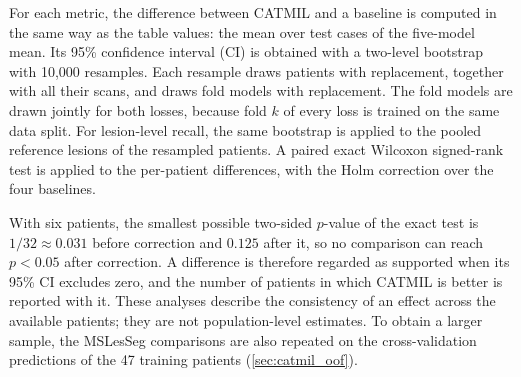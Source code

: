 For each metric, the difference between CATMIL and a baseline is computed
in the same way as the table values: the mean over test cases of the
five-model mean. Its 95\% confidence interval (CI) is obtained with a
two-level bootstrap with 10{,}000 resamples. Each resample draws patients
with replacement, together with all their scans, and draws fold models with
replacement. The fold models are drawn jointly for both losses, because
fold $k$ of every loss is trained on the same data split. For lesion-level
recall, the same bootstrap is applied to the pooled reference lesions of
the resampled patients. A paired exact Wilcoxon signed-rank test is applied
to the per-patient differences, with the Holm correction over the four
baselines.

With six patients, the smallest possible two-sided $p$-value of the exact
test is $1/32 \approx 0.031$ before correction and $0.125$ after it, so no
comparison can reach $p < 0.05$ after correction. A difference is
therefore regarded as supported when its 95\% CI excludes zero, and the
number of patients in which CATMIL is better is reported with it. These
analyses describe the consistency of an effect across the available
patients; they are not population-level estimates. To obtain a larger
sample, the MSLesSeg comparisons are also repeated on the cross-validation
predictions of the 47 training patients (\cref{sec:catmil_oof}).
